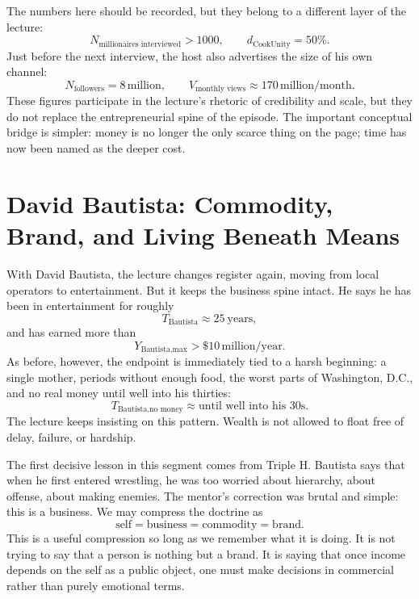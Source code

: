 The numbers here should be recorded, but they belong to a different layer of the lecture:
\begin{equation}
N_{\text{millionaires interviewed}} > 1000,\qquad
d_{\text{CookUnity}} = 50\%.
\end{equation}
Just before the next interview, the host also advertises the size of his own channel:
\begin{equation}
N_{\text{followers}} = 8\,\text{million},\qquad
V_{\text{monthly views}} \approx 170\,\text{million/month}.
\end{equation}
These figures participate in the lecture's rhetoric of credibility and scale, but they do not replace the entrepreneurial spine of the episode. The important conceptual bridge is simpler: money is no longer the only scarce thing on the page; time has now been named as the deeper cost.

\section{David Bautista: Commodity, Brand, and Living Beneath Means}

With David Bautista, the lecture changes register again, moving from local operators to entertainment. But it keeps the business spine intact. He says he has been in entertainment for roughly
\begin{equation}
T_{\text{Bautista}} \approx 25\ \text{years},
\end{equation}
and has earned more than
\begin{equation}
Y_{\text{Bautista,max}} > \$10\,\text{million/year}.
\end{equation}
As before, however, the endpoint is immediately tied to a harsh beginning: a single mother, periods without enough food, the worst parts of Washington, D.C., and no real money until well into his thirties:
\begin{equation}
T_{\text{Bautista,no money}} \approx \text{until well into his 30s}.
\end{equation}
The lecture keeps insisting on this pattern. Wealth is not allowed to float free of delay, failure, or hardship.

The first decisive lesson in this segment comes from Triple H. Bautista says that when he first entered wrestling, he was too worried about hierarchy, about offense, about making enemies. The mentor's correction was brutal and simple: this is a business. We may compress the doctrine as
\begin{equation}
\text{self} = \text{business} = \text{commodity} = \text{brand}.
\end{equation}
This is a useful compression so long as we remember what it is doing. It is not trying to say that a person is nothing but a brand. It is saying that once income depends on the self as a public object, one must make decisions in commercial rather than purely emotional terms.

